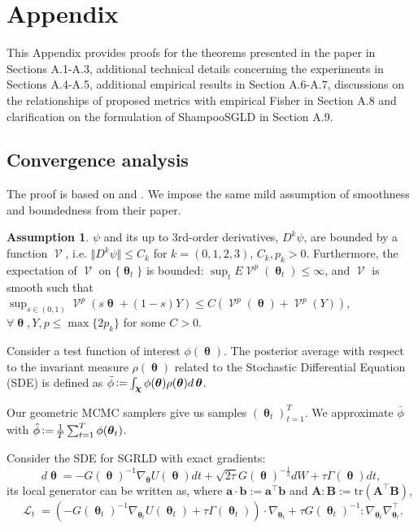 \documentclass[10pt]{article} %
\DeclareMathOperator{\btheta}{\boldsymbol{\theta}}
\DeclareMathOperator{\elL}{\mathcal{L}}
\DeclareMathOperator{\defeq}{\vcentcolon=}
\DeclareMathOperator{\elV}{\mathcal{V}}
\theoremstyle{plain}
\theoremstyle{definition}
\newtheorem{assumption}[theorem]{Assumption}
\theoremstyle{remark}
\begin{document}



\appendix
\section{Appendix}

This Appendix provides proofs for the theorems presented in the paper in Sections A.1-A.3, additional technical details concerning the experiments in Sections A.4-A.5, additional empirical results in Section A.6-A.7, discussions on the relationships of proposed metrics with empirical Fisher in Section A.8 and clarification on the formulation of ShampooSGLD in Section A.9.

\subsection{Convergence analysis}
\label{app:proof}

The proof is based on \cite{Chen2015} and \cite{Li2016}. We impose the same mild assumption of smoothness and boundedness from their paper. 

\begin{assumption}
$\psi$ and its up to 3rd-order derivatives, $D^{k}\psi$, are bounded by a function $\elV$, i.e. $\Vert D^{k}\psi\Vert\leq C_{k}$ for $k=(0,1,2,3)$, $C_{k},p_{k} > 0$. Furthermore, the expectation of $\elV$ on $\{ \btheta_t \}$ is bounded: $\sup_{t} E\elV^{p}(\btheta_t)\leq \infty$, and $\elV$ is smooth such that $\sup_{s\in (0,1)}\elV^{p}(s\btheta +(1-s)Y)\leq C(\elV^{p}(\btheta)+\elV^{p}(Y))$, $\forall\btheta , Y, p \leq \max\{ 2p_{k} \}$ for some $C > 0$.
\label{assumpA1}
\end{assumption}

Consider a test function of interest $\phi(\btheta)$. The posterior average with respect to the invariant measure $\rho(\btheta)$ related to the Stochastic Differential Equation (SDE) is defined as $\bar{\phi} \defeq \int_{\boldsymbol{\chi}}\phi(\btheta)\rho(\btheta)d\btheta$.

Our geometric MCMC samplers give us samples $(\btheta_t)_{t=1}^{T}$. We approximate $\bar{\phi}$ with $\hat{\phi} \defeq \frac{1}{T}\sum_{t=1}^{T}\phi(\btheta_{t})$.

Consider the SDE for SGRLD with exact gradients:
\begin{equation*}
d\btheta = -G(\btheta)^{-1}\nabla_{\btheta}U(\btheta)dt + \sqrt{2\tau}G(\btheta)^{-\frac{1}{2}}dW+\tau \Gamma(\btheta)dt,
\end{equation*}
its local generator can be written as, where $\textbf{a}\cdot \textbf{b} := \textbf{a}^\top \textbf{b}$ and $\textbf{A}:\textbf{B} := \textrm{tr}(\textbf{A}^\top \textbf{B})$,
\begin{equation*}
\elL_{t} = \left( -G(\btheta_t)^{-1}\nabla_{\btheta_t} U(\btheta_t) + \tau \Gamma(\btheta_t) \right) \cdot \nabla_{\btheta_t} + \tau G(\btheta_t)^{-1} : \nabla_{\btheta_t}\nabla_{\btheta_t}^{\top} .
\end{equation*}
\end{document}
